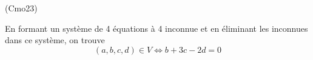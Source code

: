 \begin{tiny}(Cmo23)\end{tiny} En formant un système de 4 équations à 4 inconnue et en éliminant les inconnues dans ce système, on trouve
\begin{displaymath}
 (a,b,c,d)\in V \Leftrightarrow b+3c-2d =0
\end{displaymath}
 